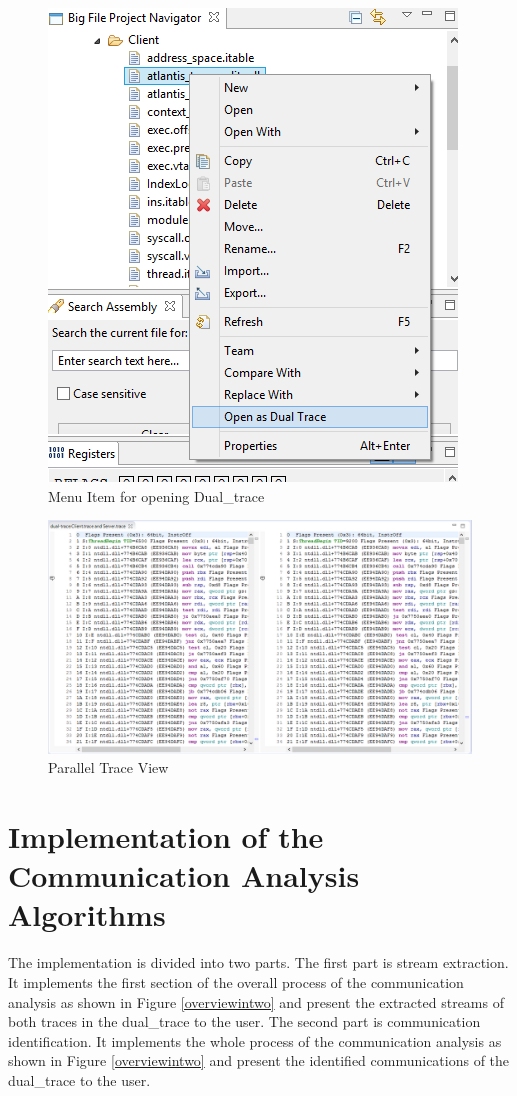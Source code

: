 \begin{figure}[H]
\centerline{\includegraphics[scale=0.4]{Figures/opendualtracemenu}}
 \caption{Menu Item for opening Dual\_trace}
\label{opendualtracemenu}
\end{figure}

\begin{figure}[H]
\centerline{\includegraphics[scale=0.6]{Figures/paralleleditor}}
 \caption{Parallel Trace View}
\label{parallelview}
\end{figure}

\section{Implementation of the Communication Analysis Algorithms}
The implementation is divided into two parts. The first part is stream extraction. It implements the first section of the overall process of the communication analysis as shown in Figure \ref{overviewintwo} and present the extracted streams of both traces in the dual\_trace to the user. The second part is communication identification. It implements the whole process of the communication analysis as shown in Figure \ref{overviewintwo} and present the identified communications of the dual\_trace to the user.

